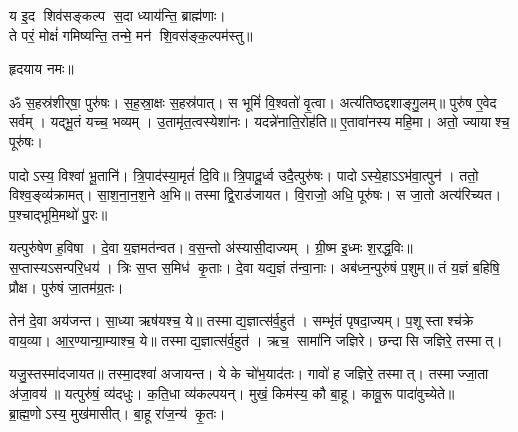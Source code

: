 \begin{center}




य इ॒द शिव॑सङ्कल्प स॒दा ध्याय॑न्ति॒ ब्राह्म॑णाः।\\
 ते परं॒ मोक्षं॑ गमिष्यन्ति॒ तन्मे॒ मन॑ शि॒वस॑ङ्क॒ल्पम॑स्तु॥

हृदयाय नमः॥
\end{center}
{\small \closesection}

ॐ स॒हस्र॑शीर्‌षा॒ पुरु॑षः। स॒ह॒स्रा॒क्षः स॒हस्र॑पात्। स भूमिं॑ वि॒श्वतो॑ वृ॒त्वा। अत्य॑तिष्ठद्दशाङ्गु॒लम्॥ पुरु॑ष ए॒वेद सर्वम्। यद्भू॒तं यच्च॒ भव्यम्। उ॒तामृ॑त॒त्वस्येशा॑नः। यदन्ने॑नाति॒रोह॑ति॥ ए॒तावा॑नस्य महि॒मा। अतो॒ ज्यायाश्च॒ पूरु॑षः।

 पादोऽस्य॒ विश्वा॑ भू॒तानि॑। त्रि॒पाद॑स्या॒मृतं॑ दि॒वि॥ त्रि॒पादू॒र्ध्व उदै॒त्पुरु॑षः। पादोऽस्ये॒हाऽऽभ॑वा॒त्पुन॑। ततो॒ विश्व॒ङ्व्य॑क्रामत्। सा॒श॒ना॒न॒श॒ने अ॒भि॥ तस्माद्वि॒राड॑जायत। वि॒राजो॒ अधि॒ पूरु॑षः। स जा॒तो अत्य॑रिच्यत। प॒श्चाद्भूमि॒मथो॑ पु॒रः॥

 यत्पुरु॑षेण ह॒विषा। दे॒वा य॒ज्ञमत॑न्वत। व॒स॒न्तो अ॑स्यासी॒दाज्यम्। ग्री॒ष्म इ॒ध्मः श॒रद्ध॒विः॥ स॒प्तास्यऽ\sav{}सन्परि॒धय॑। त्रिः स॒प्त स॒मिध॑ कृ॒ताः। दे॒वा यद्य॒ज्ञं त॑न्वा॒नाः। अब॑ध्न॒न्पुरु॑षं प॒शुम्॥ तं य॒ज्ञं ब॒\ar हिषि॒ प्रौक्ष\sn। पुरु॑षं जा॒तम॑ग्र॒तः।

 तेन॑ दे॒वा अय॑जन्त। सा॒ध्या ऋष॑यश्च॒ ये॥ तस्माद्य॒ज्ञात्स॑र्व॒हुत॑। सम्भृ॑तं पृषदा॒ज्यम्। प॒शूस्ताश्च॑क्रे वाय॒व्या\sn{}। आ॒र॒ण्यान्ग्रा॒म्याश्च॒ ये॥ तस्माद्य॒ज्ञात्स॑र्व॒हुत॑। ऋच॒ सामा॑नि जज्ञिरे। छन्दासि जज्ञिरे॒ तस्मात्।

 यजु॒स्तस्मा॑दजायत॥ तस्मा॒दश्वा॑ अजायन्त। ये के चो॑भ॒याद॑तः। गावो॑ ह जज्ञिरे॒ तस्मात्। तस्माज्जा॒ता अ॑जा॒वय॑॥ यत्पुरु॑षं॒ व्य॑दधुः। क॒ति॒धा व्य॑कल्पयन्। मुखं॒ किम॑स्य॒ कौ बा॒हू। कावू॒रू पादा॑वुच्येते॥ ब्रा॒ह्म॒णोऽस्य॒ मुख॑मासीत्। बा॒हू रा॑ज॒न्य॑ कृ॒तः।

